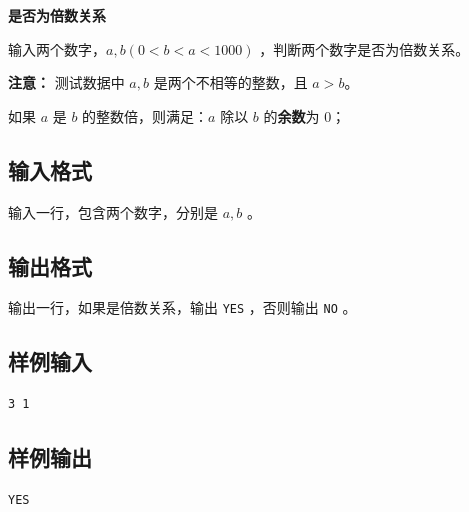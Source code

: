 \documentclass{article}
\newcommand{\problemname}[1]{\begin{center}\Large\bfseries #1\end{center}}
\begin{document}
\problemname{是否为倍数关系}

输入两个数字，$a,b(0<b<a<1000)$ ，判断两个数字是否为倍数关系。

\textbf{注意：} 测试数据中 $a,b$ 是两个不相等的整数，且 $a>b$。

如果 $a$ 是 $b$ 的整数倍，则满足：$a$ 除以 $b$ 的\textbf{余数}为 $0$；

\subsection*{输入格式}
输入一行，包含两个数字，分别是 $a,b$ 。

\subsection*{输出格式}
输出一行，如果是倍数关系，输出 \texttt{YES} ，否则输出 \texttt{NO} 。

\subsection*{样例输入}
\begin{verbatim}
3 1
\end{verbatim}

\subsection*{样例输出}
\begin{verbatim}
YES
\end{verbatim}
\end{document}
